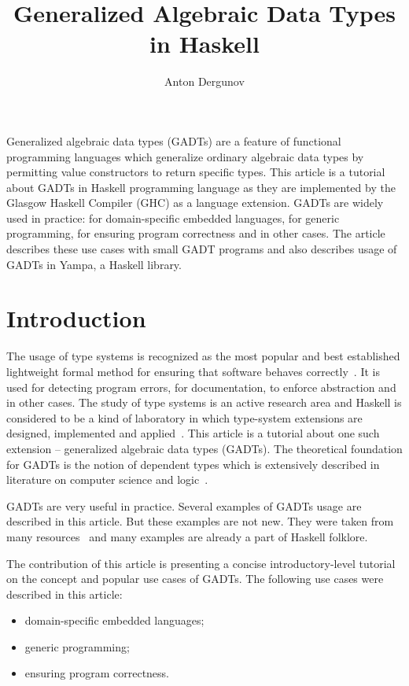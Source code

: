 \documentclass{tmr}
\title{Generalized Algebraic Data Types in Haskell}
\author{Anton Dergunov\email{anton.dergunov@gmail.com}}
\begin{document}
\begin{introduction}

Generalized algebraic data types (GADTs) are a feature of functional programming languages which generalize ordinary algebraic data types by permitting value constructors to return specific types. This article is a tutorial about GADTs in Haskell programming language as they are implemented by the Glasgow Haskell Compiler (GHC) as a language extension. GADTs are widely used in practice: for domain-specific embedded languages, for generic programming, for ensuring program correctness and in other cases. The article describes these use cases with small GADT programs and also describes usage of GADTs in Yampa, a Haskell library.

\end{introduction}

\section{Introduction}

The usage of type systems is recognized as the most popular and best established lightweight formal method for ensuring that software behaves correctly~\cite{pierce_book}. It is used for detecting program errors, for documentation, to enforce abstraction and in other cases. The study of type systems is an active research area and Haskell is considered to be a kind of laboratory in which type-system extensions are designed, implemented and applied~\cite{haskell_history}. This article is a tutorial about one such extension -- generalized algebraic data types (GADTs). The theoretical foundation for GADTs is the notion of dependent types which is extensively described in literature on computer science and logic~\cite{pierce_book}.

GADTs are very useful in practice. Several examples of GADTs usage are described in this article. But these examples are not new. They were taken from many resources~\cite{fun_with_phantom_types,replib,singletons,okasaki_red_black_trees,weirich_dependently_typed,finally_tagless,yampa_gadts} and many examples are already a part of Haskell folklore.

The contribution of this article is presenting a concise introductory-level tutorial on the concept and popular use cases of GADTs. The following use cases were described in this article:

\begin{itemize}
\item domain-specific embedded languages;
\item generic programming;
\item ensuring program correctness.
\end{itemize}
\end{document}
